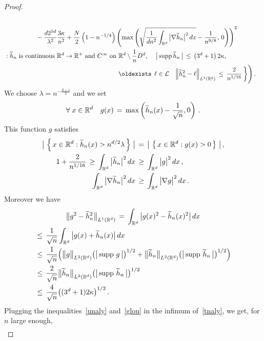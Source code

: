 \documentclass[AHL, Unicode, longabstracts, published]{cedram}
\newcommand*\supp{\text{supp\,}}
\newcommand*\Rd {{\mathbb R^d}}
\newcommand*\R{\mathbb{R}}
\newcommand*\hht{\smash{\widetilde h}}
\newcommand{\cL}{\mathcal{L}}
\renewcommand*{\exists}{\mathrel{\oldexists}}
\let\oldforall\forall
\renewcommand*{\forall}{\mathrel{\oldforall}}
\begin{document}
\begin{proof}
\begin{multline}
\begin{aligned}
\\
&\mkern90mu-\frac{d2^{5d}}{\lambda^2}
\frac{3\kappa}{n^2} +
\frac{N} {2} \left(1-n^{-1/4}
\right)
\left(\max\left(\sqrt{
\frac{1}{dn^2}\int_{\Rd}\big|\nabla \hht_n\big|^2\,dx}-
\frac{1}{n^{9/8}},\,0\right) \right)^2
\\
&:\hht_n\text{ is continuous } \Rd\to\R^+
\text{ and }C^\infty\text{ on }\Rd\setminus \frac{1}{n}D^d,\,
\quad
\big|\,\supp\hht_n\,\big|\,\leq\, \left(3^d+1\right)2\kappa,\,
\\
&\mkern320mu \exists\,\ell\in\cL\quad
\Big\|\hht_n^2- \ell\Big\|_{L^1(\Rd)}
\,\leq\,
\frac{2}{n^{1/16}}
\,\bigg\}\Bigg)\,.
\end{aligned}
\end{multline}
We choose $\lambda=n^{-\frac{d+1}{2}}$ and we set
\[
\forall x\in \Rd\quad
g(x)\,=\,\max\left(
\hht_n(x)- \frac{1}{\sqrt{n}},0 \right)\,.
\]
This function $g$ satisfies
\begin{equation}\label{unaly}
\begin{aligned}
\big|\,\left\{\,x\in \Rd:\hht_n(x)>n^{d/2}{\lambda}\,\right\}\,\big| &\,=\,
\big|\,\left\{\,x\in \Rd:g(x)>0\,\right\}\,\big|\,,\\ 1+\frac{2}{n^{1/16}}
\,\geq\,\int_{\Rd}\big|\hht_n\big|^2\,dx &\,\geq\,
\int_{\Rd}\big| g\big|^2\,dx\,,\\
\int_{\Rd}\big|\nabla \hht_n\big|^2\,dx &\,\geq\,
\int_{\Rd}\big|\nabla g\big|^2\,dx\,.
\hfil
\end{aligned}
\end{equation}
Moreover we have
\begin{multline}\label{glou}
\big\|g^2-\hht_n^2\big\|_{L^1(\Rd)}\,=\,
\int_{\Rd}\big| g(x)^2-
\hht_n(x)^2
\big|\,dx\\
\begin{aligned}
&\leq\,\frac{1}{\sqrt{n}}\int_{\Rd}\big| g(x)+\hht_n(x)\big|\,dx\\
&\leq\,
\frac{1}{\sqrt{n}}\Big(
\big\|g\big\|_{L^2(\Rd)}
\big(\big|\,\supp\,g\,\big|\big)^{1/2}+
\big\|\hht_n\big\|_{L^2(\Rd)}
\big(\big|\,\supp\,\hht_n\,\big|\big)^{1/2}\Big)\\
&\leq\,
\frac{2}{\sqrt{n}}
\big\|\hht_n\big\|_{L^2(\Rd)}
\big(\big|\,\supp\,\hht_n\,\big|\big)^{1/2}\\ &\leq\,
\frac{4}{\sqrt{n}}
\big((3^d+1)2\kappa\big)^{1/2}\,.
\end{aligned}
\end{multline}
Plugging the inequalities~\eqref{unaly} and~\eqref{glou} in the infimum of~\eqref{tnaly}, we get, for $n$ large enough,
\begin{multline*}

\end{multline*}
\end{proof}
\end{document}
